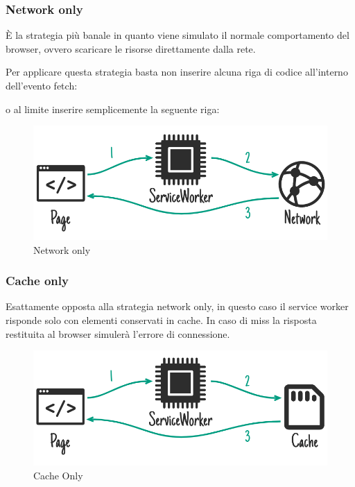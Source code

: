 \documentclass[11pt ,a4paper , twoside , openright ]{article}
\begin{document}
\subsubsection{Network only}
È la strategia più banale in quanto viene simulato il normale comportamento del browser, ovvero scaricare le risorse direttamente dalla rete.

Per applicare  questa strategia basta non inserire alcuna riga di codice all’interno dell’evento fetch:

o al limite inserire semplicemente la seguente riga:

\begin{figure}[h]
	\centering
	\includegraphics[width=1\linewidth]{Strategia3}
	\caption{Network only}
	\label{fig: Network only}
\end{figure}
\pagebreak
\subsubsection{Cache only}
Esattamente opposta alla strategia network only, in questo caso il service worker risponde solo con elementi conservati in cache. In caso di miss la risposta restituita al browser simulerà l’errore di connessione.

\begin{figure}[h]
	\centering
	\includegraphics[width=1\linewidth]{Strategia4}
	\caption{Cache Only}
	\label{fig: Cache Only}
\end{figure}
\pagebreak
\end{document}
